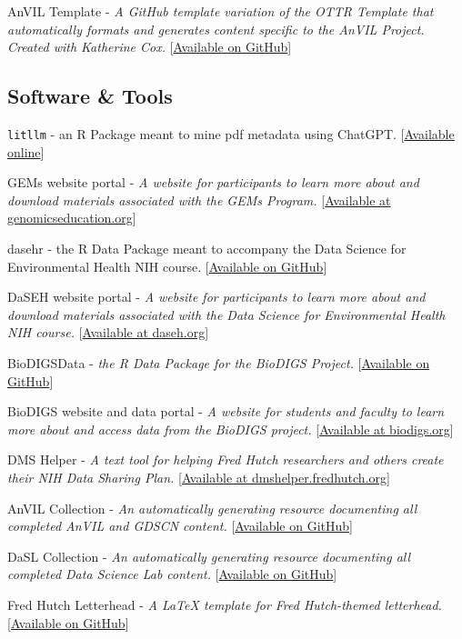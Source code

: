 \documentclass{cv}
\begin{document}
AnVIL Template - \textit{A GitHub template variation of the OTTR Template that automatically formats and generates content specific to the AnVIL Project. Created with Katherine Cox.} [\href{https://github.com/jhudsl/AnVIL_Template}{Available on GitHub}]

\subsection*{Software \& Tools}

\texttt{litllm} - an R Package meant to mine pdf metadata using ChatGPT. [\href{https://avahoffman.com/litllm}{Available online}]

GEMs website portal - \textit{A website for participants to learn more about and download materials associated with the GEMs Program.} [\href{https://genomicseducation.org}{Available at genomicseducation.org}]

dasehr - the R Data Package meant to accompany the Data Science for Environmental Health NIH course. [\href{https://github.com/fhdsl/dasehr}{Available on GitHub}]

DaSEH website portal - \textit{A website for participants to learn more about and download materials associated with the Data Science for Environmental Health NIH course.} [\href{https://daseh.org}{Available at daseh.org}]

BioDIGSData - \textit{the R Data Package for the BioDIGS Project.} [\href{https://github.com/fhdsl/BioDIGSData}{Available on GitHub}]

BioDIGS website and data portal - \textit{A website for students and faculty to learn more about and access data from the BioDIGS project.} [\href{https://biodigs.org}{Available at biodigs.org}]

DMS Helper - \textit{A text tool for helping Fred Hutch researchers and others create their NIH Data Sharing Plan.} [\href{https://dmshelper.fredhutch.org}{Available at dmshelper.fredhutch.org}]

AnVIL Collection - \textit{An automatically generating resource documenting all completed AnVIL and GDSCN content.} [\href{https://github.com/fhdsl/AnVIL_Collection}{Available on GitHub}]

DaSL Collection - \textit{An automatically generating resource documenting all completed Data Science Lab content.} [\href{https://github.com/fhdsl/DaSL_Collection}{Available on GitHub}]

Fred Hutch Letterhead - \textit{A LaTeX template for Fred Hutch-themed letterhead.} [\href{https://github.com/fhdsl/FH_letterhead}{Available on GitHub}]
\end{document}
